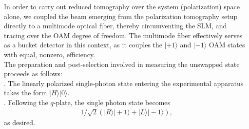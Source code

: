\documentclass[12pt]{iopart}
\begin{document}
In order to carry out reduced tomography over the system (polarization) space alone, we coupled the beam emerging from the polarization tomography setup directly to a multimode optical fiber, thereby circumventing the SLM, and tracing over the OAM degree of freedom. The multimode fiber effectively serves as a bucket detector in this context, as it couples the $|+1\rangle$ and $|-1\rangle$ OAM states with equal, nonzero, efficiency. \\

\noindent The preparation and post-selection involved in measuring the unswapped state proceeds as follows: \\

. The linearly polarized single-photon state entering the experimental apparatus takes the form $|H\rangle|0\rangle$. \\

. Following the $q$-plate, the single photon state becomes
%
\begin{eqnarray}\label{eq:genpsi}
	1/\sqrt{2}\left(|R\rangle|+1\rangle + |L\rangle|-1\rangle \right),
\end{eqnarray}
%
as desired.

\end{document}
